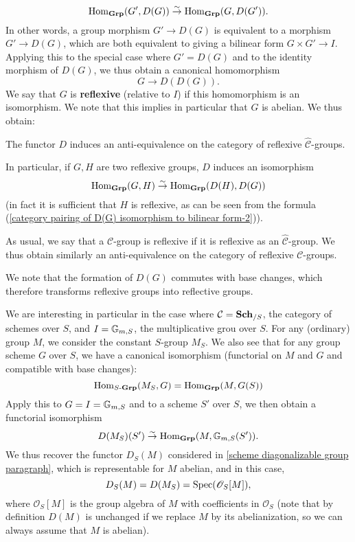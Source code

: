 \begin{equation}\label{category pairing of D(G) isomorphism to bilinear form-2}
\mathrm{Hom}_{\mathbf{Grp}}(G',D(G))\stackrel{\sim}{\to}\mathrm{Hom}_{\mathbf{Grp}}(G,D(G')).
\end{equation}
In other words, a group morphism $G'\to D(G)$ is equivalent to a morphism $G'\to D(G)$, which are both equivalent to giving a bilinear form $G\times G'\to I$. Applying this to the special case where $G'=D(G)$ and to the identity morphism of $D(G)$, we thus obtain a canonical homomorphism
\begin{equation}\label{category D(D(G)) canonical morphism}
G\to D(D(G)).
\end{equation}
We say that $G$ is \textbf{reflexive} (relative to $I$) if this homomorphism is an isomorphism. We note that this implies in particular that $G$ is abelian. We thus obtain:

\begin{proposition}
The functor $D$ induces an anti-equivalence on the category of reflexive $\widehat{\mathcal{C}}$-groups.
\end{proposition}

In particular, if $G,H$ are two reflexive groups, $D$ induces an isomorphism
\[\mathrm{Hom}_{\mathbf{Grp}}(G,H)\stackrel{\sim}{\to} \mathrm{Hom}_{\mathbf{Grp}}(D(H),D(G))\]
(in fact it is sufficient that $H$ is reflexive, as can be seen from the formula (\ref{category pairing of D(G) isomorphism to bilinear form-2})).\par
As usual, we say that a $\mathcal{C}$-group is reflexive if it is reflexive as an $\widehat{\mathcal{C}}$-group. We thus obtain similarly an anti-equivalence on the category of reflexive $\mathcal{C}$-groups.

\begin{remark}
We note that the formation of $D(G)$ commutes with base changes, which therefore transforms reflexive groups into reflective groups.
\end{remark}

We are interesting in particular in the case where $\mathcal{C}=\mathbf{Sch}_{/S}$, the category of schemes over $S$, and $I=\mathbb{G}_{m,S}$, the multiplicative grou over $S$. For any (ordinary) group $M$, we consider the constant $S$-group $M_S$. We also see that for any group scheme $G$ over $S$, we have a canonical isomorphism (functorial on $M$ and $G$ and compatible with base changes):
\[\mathrm{Hom}_{S\textup{-}\mathbf{Grp}}(M_S,G)=\mathrm{Hom}_{\mathbf{Grp}}(M,G(S))\]
Apply this to $G=I=\mathbb{G}_{m,S}$ and to a scheme $S'$ over $S$, we then obtain a functorial isomorphism
\begin{equation}\label{scheme D(M_S) isomorphism to group homo to G_m}
D(M_S)(S')\stackrel{\sim}{\to}\mathrm{Hom}_{\mathbf{Grp}}(M,\mathbb{G}_{m,S}(S')).
\end{equation}
We thus recover the functor $D_S(M)$ considered in \ref{scheme diagonalizable group paragraph}, which is representable for $M$ abelian, and in this case,
\[D_S(M)=D(M_S)=\mathrm{Spec}(\mathscr{O}_S[M]),\]
where $\mathscr{O}_S[M]$ is the group algebra of $M$ with coefficients in $\mathscr{O}_S$ (note that by definition $D(M)$ is unchanged if we replace $M$ by its abelianization, so we can always assume that $M$ is abelian).

